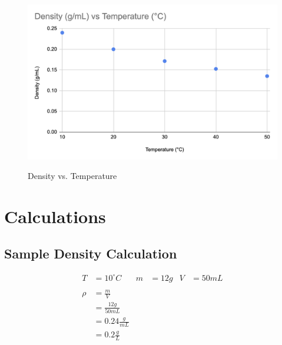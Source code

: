 \documentclass[11pt, oneside]{article}   	%
\begin{document}
\begin{figure}[p]
\centering
 \caption{Density vs. Temperature}
\includegraphics[scale=0.5]{Sample_Lab_Chart_2.png}
 \label{figure:sampleChart2}
 \end{figure}  

\section{Calculations}

\subsection{Sample Density Calculation}
 \begin{equation}
 \boxed{
\begin{split}
       T &= 10^{\circ}C & m &= 12 g & V &=  50mL \\
       \\
  	\rho &= \frac{m}{V} \\
	       &= \frac{12 g}{50 mL} \\
	       &= 0.24 \frac{g}{mL} \\
	       &= 0.2 \frac{g}{L} 
 \end{split}
 }
 \end{equation}
 
\end{document}
